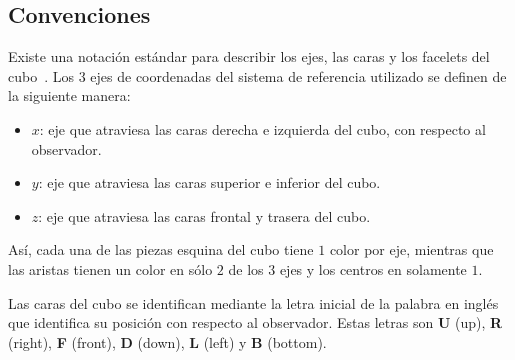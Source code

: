 \subsection{Convenciones}\label{convenciones}
Existe una notación estándar para describir los ejes, las caras y los facelets del cubo~\cite{notationsingmaster}.
Los $3$ ejes de coordenadas del sistema de referencia utilizado se definen de la siguiente manera:
\begin{itemize}
	\item $x$: eje que atraviesa las caras derecha e izquierda del cubo, con respecto al observador.
	\item $y$: eje que atraviesa las caras superior e inferior del cubo.
	\item $z$: eje que atraviesa las caras frontal y trasera del cubo.
\end{itemize}
Así, cada una de las piezas esquina del cubo tiene $1$ color por eje, mientras que las aristas tienen un color en sólo $2$ de los $3$ ejes y los centros en solamente $1$.

Las caras del cubo se identifican mediante la letra inicial de la palabra en inglés que identifica su posición con respecto al observador.
Estas letras son \textbf{U} (up), \textbf{R} (right), \textbf{F} (front), \textbf{D} (down), \textbf{L} (left) y \textbf{B} (bottom).

